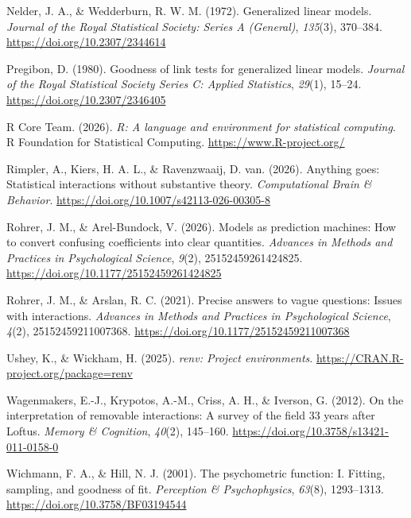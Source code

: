 \documentclass[
  man,
  floatsintext,
  longtable,
  nolmodern,
  notxfonts,
  notimes,
  colorlinks=true,linkcolor=blue,citecolor=blue,urlcolor=blue]{apa7}
\newlength{\cslhangindent}
\newenvironment{CSLReferences}[2] %
 {\begin{list}{}{%
  \setlength{\itemindent}{0pt}
  \setlength{\leftmargin}{0pt}
  \setlength{\parsep}{0pt}
  \ifodd #1
   \setlength{\leftmargin}{\cslhangindent}
   \setlength{\itemindent}{-1\cslhangindent}
  \fi
  \setlength{\itemsep}{#2\baselineskip}}}
 {\end{list}}
\begin{document}
\begin{CSLReferences}{1}{0}
Nelder, J. A., \& Wedderburn, R. W. M. (1972). Generalized linear
models. \emph{Journal of the Royal Statistical Society: Series A
(General)}, \emph{135}(3), 370--384.
\url{https://doi.org/10.2307/2344614}

Pregibon, D. (1980). Goodness of link tests for generalized linear
models. \emph{Journal of the Royal Statistical Society Series C: Applied
Statistics}, \emph{29}(1), 15--24. \url{https://doi.org/10.2307/2346405}

R Core Team. (2026). \emph{R: A language and environment for statistical
computing}. R Foundation for Statistical Computing.
\url{https://www.R-project.org/}

Rimpler, A., Kiers, H. A. L., \& Ravenzwaaij, D. van. (2026). Anything
goes: Statistical interactions without substantive theory.
\emph{Computational Brain \& Behavior}.
\url{https://doi.org/10.1007/s42113-026-00305-8}

Rohrer, J. M., \& Arel-Bundock, V. (2026). Models as prediction
machines: How to convert confusing coefficients into clear quantities.
\emph{Advances in Methods and Practices in Psychological Science},
\emph{9}(2), 25152459261424825.
\url{https://doi.org/10.1177/25152459261424825}

Rohrer, J. M., \& Arslan, R. C. (2021). Precise answers to vague
questions: Issues with interactions. \emph{Advances in Methods and
Practices in Psychological Science}, \emph{4}(2), 25152459211007368.
\url{https://doi.org/10.1177/25152459211007368}

Ushey, K., \& Wickham, H. (2025). \emph{{renv}: Project environments}.
\url{https://CRAN.R-project.org/package=renv}

Wagenmakers, E.-J., Krypotos, A.-M., Criss, A. H., \& Iverson, G.
(2012). On the interpretation of removable interactions: A survey of the
field 33 years after {Loftus}. \emph{Memory \& Cognition}, \emph{40}(2),
145--160. \url{https://doi.org/10.3758/s13421-011-0158-0}

Wichmann, F. A., \& Hill, N. J. (2001). The psychometric function: I.
Fitting, sampling, and goodness of fit. \emph{Perception \&
Psychophysics}, \emph{63}(8), 1293--1313.
\url{https://doi.org/10.3758/BF03194544}


\end{CSLReferences}
\end{document}
